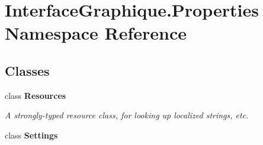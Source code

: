 \hypertarget{namespace_interface_graphique_1_1_properties}{}\section{Interface\+Graphique.\+Properties Namespace Reference}
\label{namespace_interface_graphique_1_1_properties}
\subsection*{Classes}
\begin{DoxyCompactItemize}
\item 
class {\bfseries Resources}
\begin{DoxyCompactList}\small\item\em A strongly-\/typed resource class, for looking up localized strings, etc. \end{DoxyCompactList}\item 
class {\bfseries Settings}
\end{DoxyCompactItemize}
